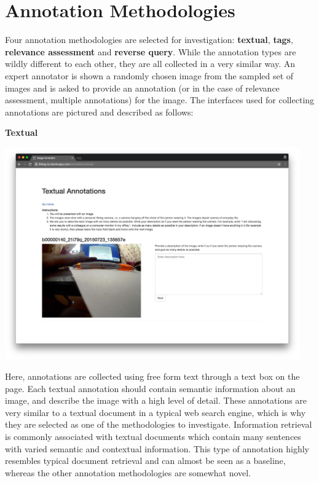 
\section{Annotation Methodologies}

Four annotation methodologies are selected for investigation: \textbf{textual}, \textbf{tags}, \textbf{relevance assessment} and \textbf{reverse query}. While the annotation types are wildly different to each other, they are all collected in a very similar way. An expert annotator is shown a randomly chosen image from the sampled set of images and is asked to provide an annotation (or in the case of relevance assessment, multiple annotations) for the image. The interfaces used for collecting annotations are pictured and described as follows:

\textbf{Textual}

\includegraphics[width=0.95\textwidth]{images/text-interface}

Here, annotations are collected using free form text through a text box on the page. Each textual annotation should contain semantic information about an image, and describe the image with a high level of detail. These annotations are very similar to a textual document in a typical web search engine, which is why they are selected as one of the methodologies to investigate. Information retrieval is commonly associated with textual documents which contain many sentences with varied semantic and contextual information. This type of annotation highly resembles typical document retrieval and can almost be seen as a baseline, whereas the other annotation methodologies are somewhat novel.

